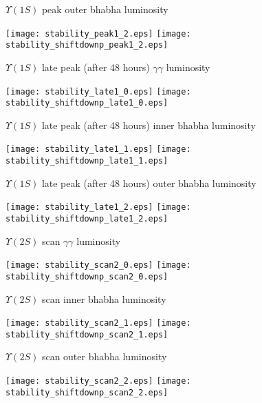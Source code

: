 \documentclass[12pt]{article}
\begin{document}
\vfill $\Upsilon(1S)$ peak outer bhabha luminosity

\begin{center}
\texttt{[image: stability\_peak1\_2.eps]} \texttt{[image: stability\_shiftdownp\_peak1\_2.eps]}
\end{center}

\pagebreak

$\Upsilon(1S)$ late peak (after 48 hours) $\gamma\gamma$ luminosity

\begin{center}
\texttt{[image: stability\_late1\_0.eps]} \texttt{[image: stability\_shiftdownp\_late1\_0.eps]}
\end{center}


\vfill $\Upsilon(1S)$ late peak (after 48 hours) inner bhabha luminosity

\begin{center}
\texttt{[image: stability\_late1\_1.eps]} \texttt{[image: stability\_shiftdownp\_late1\_1.eps]}
\end{center}


\vfill $\Upsilon(1S)$ late peak (after 48 hours) outer bhabha luminosity

\begin{center}
\texttt{[image: stability\_late1\_2.eps]} \texttt{[image: stability\_shiftdownp\_late1\_2.eps]}
\end{center}

\pagebreak

$\Upsilon(2S)$ scan $\gamma\gamma$ luminosity

\begin{center}
\texttt{[image: stability\_scan2\_0.eps]} \texttt{[image: stability\_shiftdownp\_scan2\_0.eps]}
\end{center}


\vfill $\Upsilon(2S)$ scan inner bhabha luminosity

\begin{center}
\texttt{[image: stability\_scan2\_1.eps]} \texttt{[image: stability\_shiftdownp\_scan2\_1.eps]}
\end{center}


\vfill $\Upsilon(2S)$ scan outer bhabha luminosity

\begin{center}
\texttt{[image: stability\_scan2\_2.eps]} \texttt{[image: stability\_shiftdownp\_scan2\_2.eps]}
\end{center}
\end{document}
